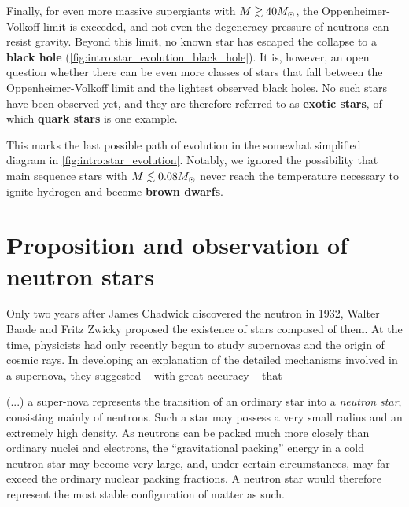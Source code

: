 Finally, for even more massive supergiants with $M \gtrsim 40 M_\odot$, the Oppenheimer-Volkoff limit is exceeded, and not even the degeneracy pressure of neutrons can resist gravity.
Beyond this limit, no known star has escaped the collapse to a \textbf{black hole} (\cref{fig:intro:star_evolution_black_hole}).
It is, however, an open question whether there can be even more classes of stars that fall between the Oppenheimer-Volkoff limit and the lightest observed black holes.
No such stars have been observed yet, and they are therefore referred to as \textbf{exotic stars}, of which \textbf{quark stars} is one example.

This marks the last possible path of evolution in the somewhat simplified diagram in \cref{fig:intro:star_evolution}.
Notably, we ignored the possibility that main sequence stars with $M \lesssim 0.08 M_\odot$ never reach the temperature necessary to ignite hydrogen and become \textbf{brown dwarfs}.

\section{Proposition and observation of neutron stars}

Only two years after James Chadwick discovered the neutron in 1932, \cite{ref:neutron_discovery}
Walter Baade and Fritz Zwicky proposed the existence of stars composed of them.
At the time, physicists had only recently begun to study supernovas and the origin of cosmic rays.
In developing an explanation of the detailed mechanisms involved in a supernova, they suggested -- with great accuracy -- that
\cite[page 263]{ref:supernova_cosmic_rays_neutron_stars}
\begin{displayquote}
(...) %
a super-nova represents the transition of an ordinary star into a \emph{neutron star}, consisting mainly of neutrons.
Such a star may possess a very small radius and an extremely high density.
As neutrons can be packed much more closely than ordinary nuclei and electrons, the ``gravitational packing'' energy in a cold neutron star may become very large, and, under certain circumstances, may far exceed the ordinary nuclear packing fractions.
A neutron star would therefore represent the most stable configuration of matter as such.
\end{displayquote}

